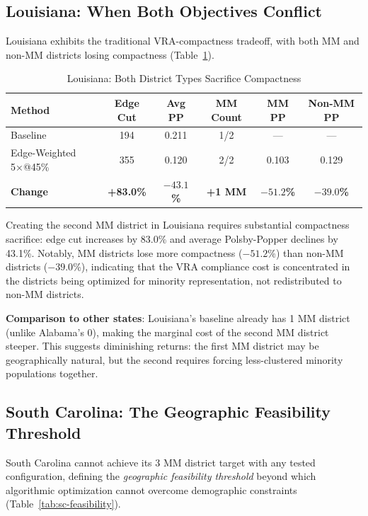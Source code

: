 \subsection{Louisiana: When Both Objectives Conflict}

Louisiana exhibits the traditional VRA-compactness tradeoff, with both MM and non-MM districts losing compactness (Table~\ref{tab:louisiana-analysis}).

\begin{table}[htbp]
\centering
\caption{Louisiana: Both District Types Sacrifice Compactness}
\label{tab:louisiana-analysis}
\begin{tabular}{lccccc}
\toprule
\textbf{Method} & \textbf{Edge Cut} & \textbf{Avg PP} & \textbf{MM Count} & \textbf{MM PP} & \textbf{Non-MM PP} \\
\midrule
Baseline        & 194 & 0.211 & 1/2 & --- & --- \\
Edge-Weighted 5×@45\% & 355 & 0.120 & 2/2 & 0.103 & 0.129 \\
\textbf{Change} & \textbf{+83.0\%} & \textbf{$-43.1$\%} & \textbf{+1 MM} & \textbf{$-51.2$\%} & \textbf{$-39.0$\%} \\
\bottomrule
\end{tabular}
\end{table}

Creating the second MM district in Louisiana requires substantial compactness sacrifice: edge cut increases by 83.0\% and average Polsby-Popper declines by 43.1\%. Notably, MM districts lose more compactness ($-51.2$\%) than non-MM districts ($-39.0$\%), indicating that the VRA compliance cost is concentrated in the districts being optimized for minority representation, not redistributed to non-MM districts.

\textbf{Comparison to other states}: Louisiana's baseline already has 1 MM district (unlike Alabama's 0), making the marginal cost of the second MM district steeper. This suggests diminishing returns: the first MM district may be geographically natural, but the second requires forcing less-clustered minority populations together.

\subsection{South Carolina: The Geographic Feasibility Threshold}

South Carolina cannot achieve its 3 MM district target with any tested configuration, defining the \emph{geographic feasibility threshold} beyond which algorithmic optimization cannot overcome demographic constraints (Table~\ref{tab:sc-feasibility}).


